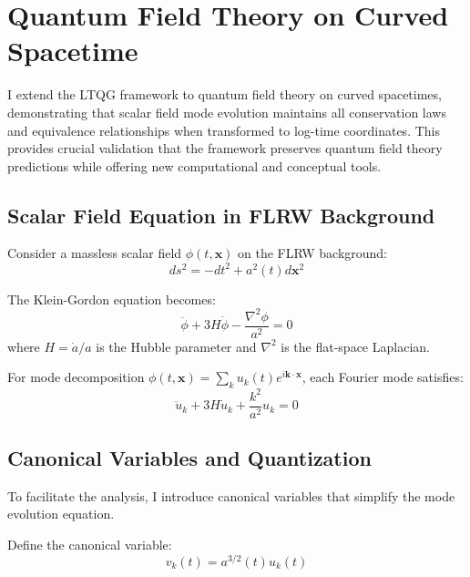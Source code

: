 \section{Quantum Field Theory on Curved Spacetime}
\label{sec:qft}

I extend the LTQG framework to quantum field theory on curved spacetimes, demonstrating that scalar field mode evolution maintains all conservation laws and equivalence relationships when transformed to log-time coordinates. This provides crucial validation that the framework preserves quantum field theory predictions while offering new computational and conceptual tools.

\subsection{Scalar Field Equation in FLRW Background}
\label{subsec:scalar_field_flrw}

Consider a massless scalar field $\phi(t,\mathbf{x})$ on the FLRW background:
\begin{equation}
ds^2 = -dt^2 + a^2(t) d\mathbf{x}^2
\end{equation}

The Klein-Gordon equation becomes:
\begin{equation}
\ddot{\phi} + 3H\dot{\phi} - \frac{\nabla^2\phi}{a^2} = 0
\label{eq:klein_gordon_flrw}
\end{equation}
where $H = \dot{a}/a$ is the Hubble parameter and $\nabla^2$ is the flat-space Laplacian.

For mode decomposition $\phi(t,\mathbf{x}) = \sum_k u_k(t) e^{i\mathbf{k} \cdot \mathbf{x}}$, each Fourier mode satisfies:
\begin{equation}
\ddot{u}_k + 3H\dot{u}_k + \frac{k^2}{a^2} u_k = 0
\label{eq:mode_equation_tau}
\end{equation}

\subsection{Canonical Variables and Quantization}
\label{subsec:canonical_variables}

To facilitate the analysis, I introduce canonical variables that simplify the mode evolution equation.

\begin{definition}
Define the canonical variable:
\begin{equation}
v_k(t) = a^{3/2}(t) u_k(t)
\label{eq:canonical_variable}
\end{equation}
\end{definition}

